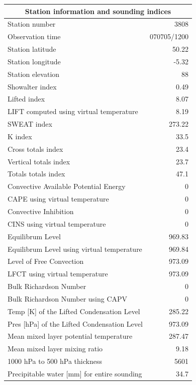 \documentclass{article}
\begin{document}
\newpage
\begin{longtable}{l|r}
\multicolumn{2}{c}{\textbf{Station information and sounding indices}
}\\ \hline
Station number & 3808 \\
Observation time & \multicolumn{1}{l}{ 070705/1200} \\
Station latitude & 50.22 \\
Station longitude & -5.32 \\
Station elevation & 88 \\
Showalter index & 0.49 \\
Lifted index & 8.07 \\
LIFT computed using virtual temperature & 8.19 \\
SWEAT index & 273.22 \\
K index & 33.5 \\
Cross totals index & 23.4 \\
Vertical totals index & 23.7 \\
Totals totals index & 47.1 \\
Convective Available Potential Energy & 0 \\
CAPE using virtual temperature & 0 \\
Convective Inhibition & 0 \\
CINS using virtual temperature & 0 \\
Equilibrum Level & 969.83 \\
Equilibrum Level using virtual temperature & 969.84 \\
Level of Free Convection & 973.09 \\
LFCT using virtual temperature & 973.09 \\
Bulk Richardson Number & 0 \\
Bulk Richardson Number using CAPV & 0 \\
Temp [K] of the Lifted Condensation Level & 285.22 \\
Pres [hPa] of the Lifted Condensation Level & 973.09 \\
Mean mixed layer potential temperature & 287.47 \\
Mean mixed layer mixing ratio & 9.18 \\
1000 hPa to 500 hPa thickness & 5601 \\
Precipitable water [mm] for entire sounding & 34.7 \\
\end{longtable}%

\newpage
\end{document}
